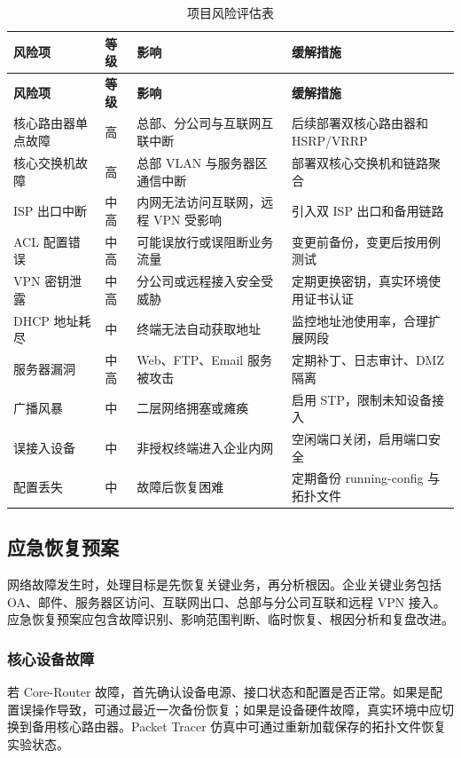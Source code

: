 \documentclass[12pt,a4paper]{ctexart}
\begin{document}
\begin{longtable}{|p{3cm}|p{2cm}|p{5cm}|p{4cm}|}
\caption{项目风险评估表}
\label{tab:risk-assessment}\\
\hline
\textbf{风险项} & \textbf{等级} & \textbf{影响} & \textbf{缓解措施} \\ \hline
\endfirsthead
\hline
\textbf{风险项} & \textbf{等级} & \textbf{影响} & \textbf{缓解措施} \\ \hline
\endhead
核心路由器单点故障 & 高 & 总部、分公司与互联网互联中断 & 后续部署双核心路由器和 HSRP/VRRP \\ \hline
核心交换机故障 & 高 & 总部 VLAN 与服务器区通信中断 & 部署双核心交换机和链路聚合 \\ \hline
ISP 出口中断 & 中高 & 内网无法访问互联网，远程 VPN 受影响 & 引入双 ISP 出口和备用链路 \\ \hline
ACL 配置错误 & 中高 & 可能误放行或误阻断业务流量 & 变更前备份，变更后按用例测试 \\ \hline
VPN 密钥泄露 & 中高 & 分公司或远程接入安全受威胁 & 定期更换密钥，真实环境使用证书认证 \\ \hline
DHCP 地址耗尽 & 中 & 终端无法自动获取地址 & 监控地址池使用率，合理扩展网段 \\ \hline
服务器漏洞 & 中高 & Web、FTP、Email 服务被攻击 & 定期补丁、日志审计、DMZ 隔离 \\ \hline
广播风暴 & 中 & 二层网络拥塞或瘫痪 & 启用 STP，限制未知设备接入 \\ \hline
误接入设备 & 中 & 非授权终端进入企业内网 & 空闲端口关闭，启用端口安全 \\ \hline
配置丢失 & 中 & 故障后恢复困难 & 定期备份 running-config 与拓扑文件 \\ \hline
\end{longtable}

\subsection{应急恢复预案}

网络故障发生时，处理目标是先恢复关键业务，再分析根因。企业关键业务包括 OA、邮件、服务器区访问、互联网出口、总部与分公司互联和远程 VPN 接入。应急恢复预案应包含故障识别、影响范围判断、临时恢复、根因分析和复盘改进。

\subsubsection{核心设备故障}

若 Core-Router 故障，首先确认设备电源、接口状态和配置是否正常。如果是配置误操作导致，可通过最近一次备份恢复；如果是设备硬件故障，真实环境中应切换到备用核心路由器。Packet Tracer 仿真中可通过重新加载保存的拓扑文件恢复实验状态。
\end{document}
